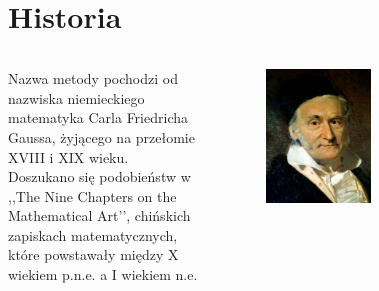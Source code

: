 \documentclass{beamer}
\begin{document}
	\section{Historia}
	\begin{frame}
		\begin{columns}
		\column{3in}
			Nazwa metody pochodzi od nazwiska niemieckiego matematyka Carla Friedricha Gaussa, żyjącego na przełomie XVIII i XIX wieku.
			\newline \\
			Doszukano się podobieństw w ,,The Nine Chapters on the Mathematical Art’’, chińskich zapiskach matematycznych, które powstawały między X wiekiem p.n.e. a I wiekiem n.e.
		\column{1.5in}
			\begin{figure}
				\includegraphics[scale=0.3]{gfx/Carl_Friedrich_Gauss.jpg}
			\end{figure}
			\begin{figure}

\end{figure}
\end{columns}
\end{frame}
\end{document}
